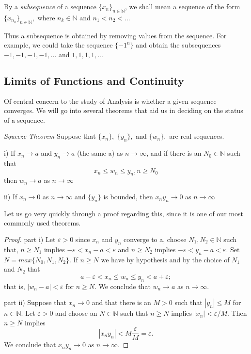 \begin{definition}
By a \emph{subsequence} of a sequence $\{x_n\}_{n \in \mathbb{N}}$, we shall mean a sequence of the form $\{x_{n_k}\}_{n \in \mathbb{N}},$ where $n_k \in \mathbb{N}$ and $n_1 < n_2 < ...$ 
\end{definition}

Thus a subsequence is obtained by removing values from the sequence. For example, we could take the sequence $\{-1^n\}$ and obtain the subsequences $-1, -1, -1, -1, ...$ and $1, 1, 1, 1, ...$

\subsection{Limits of Functions and Continuity}

Of central concern to the study of Analysis is whether a given sequence converges. We will go into several theorems that aid us in deciding on the status of a sequence.

\begin{theorem} \emph{Squeeze Theorem}\newline
Suppose that $\{x_n\},$ $\{y_n\},$ and $\{w_n\},$ are real sequences.\newline

i) If $x_n \to a$ and $y_n \to a$ (the same a) as $n \to \infty$, and if there is an $N_0 \in \mathbb{N}$ such that
$$x_n \leq w_n \leq y_n,  n \geq N_0$$
then $w_n \to a$ as $n \to \infty$

ii) If $x_n \to 0$ as $n \to \infty$ and $\{y_n\}$ is bounded, then $x_n y_n \to 0$ as $n \to \infty$

\end{theorem}

Let us go very quickly through a proof regarding this, since it is one of our most commonly used theorems.

\begin{proof}
part i) Let $\varepsilon >0$ since $x_n$ and $y_n$ converge to a, choose $N_1,N_2 \in \mathbb{N}$ such that, $n \geq N_1$ implies $-\varepsilon < x_n - a < \varepsilon$ and $n \geq N_2$ implies $-\varepsilon < y_n - a < \varepsilon.$ Set $N = max\{N_0, N_1, N_2\}.$ If $n \geq N$ we have by hypothesis and by the choice of $N_1$ and $N_2$ that $$a-\varepsilon < x_n \leq w_n \leq y_n < a + \varepsilon;$$ that is, $|w_n -a| < \varepsilon$ for $n \geq N.$ We conclude that $w_n \to a$ as $n \to \infty.$\newline

part ii) Suppose that $x_n \to 0$ and that there is an $M > 0$ such that $|y_n| \leq M$ for $n \in \mathbb{N}.$ Let $\varepsilon > 0$ and choose an $N \in \mathbb{N}$ such that $n \geq N$ implies $|x_n| < \varepsilon / M.$ Then $n \geq N$ implies $$|x_n y_n| < M \frac{\varepsilon}{M}=\varepsilon.$$
We conclude that $x_n y_n \to 0$ as $n \to \infty.$
\end{proof}

